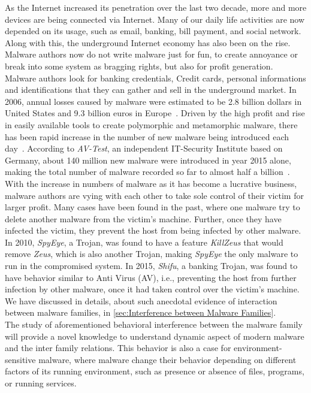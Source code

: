 As the Internet increased its penetration over the last two decade, more and more devices are being connected via Internet.
Many of our daily life activities are now depended on its usage, such as email, banking, bill payment, and social network.
Along with this, the underground Internet economy has also been on the rise.
Malware authors now do not write malware just for fun, to create annoyance or break into some system as bragging rights, but also for profit generation.
Malware authors look for banking credentials, Credit cards, personal informations and identifications that they can gather and sell in the underground market.
In 2006, annual losses caused by malware were estimated to be 2.8 billion dollars in United States and 9.3 billion euros in Europe~\cite[]{moore2009economics}.
Driven by the high profit and rise in easily available tools to create polymorphic and metamorphic malware, there has been rapid increase in the number of new malware being introduced each day~\cite[]{tian}.
According to \emph{AV-Test}, an independent IT-Security Institute based on Germany, about 140 million new malware were introduced in year 2015 alone, making the total number of malware recorded so far to almost half a billion~\cite[]{avtest}.
\\
With the increase in numbers of malware as it has become a lucrative business, malware authors are vying with each other to take sole control of their victim for larger profit.
Many cases have been found in the past, where one malware try to delete another malware from the victim's machine.
Further, once they have infected the victim, they prevent the host from being infected by other malware.
In 2010, \emph{SpyEye}, a Trojan, was found to have a feature \emph{KillZeus} that would remove \emph{Zeus}, which is also another Trojan, making \emph{SpyEye} the only malware to run in the compromised system.
In 2015, \emph{Shifu}, a banking Trojan, was found to have behavior similar to Anti Virus (AV), i.e., preventing the host from further infection by other malware, once it had taken control over the victim's machine.
We have discussed in details, about such anecdotal evidence of interaction between malware families, in \autoref{sec:Interference between Malware Families}.\\
The study of aforementioned behavioral interference between the malware family will provide a novel knowledge to understand dynamic aspect of modern malware and the inter family relations.
This behavior is also a case for environment-sensitive malware, where malware change their behavior depending on different factors of its running environment, such as presence or absence of files, programs, or running services.
